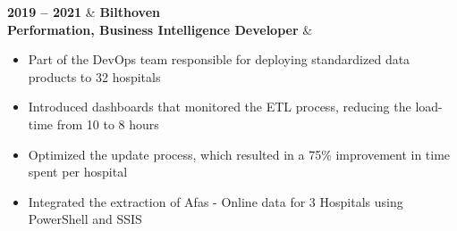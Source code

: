 \textbf{2019 – 2021} & \textbf{Bilthoven} \\
\textbf{Performation, Business Intelligence Developer} \faExternalLink & 
\begin{itemize}[leftmargin=0.5cm,itemsep=0pt,parsep=0pt]
\item Part of the DevOps team responsible for deploying standardized data products to 32 hospitals
\item Introduced dashboards that monitored the ETL process, reducing the load-time from 10 to 8 hours
\item Optimized the update process, which resulted in a 75\% improvement in time spent per hospital
\item Integrated the extraction of Afas - Online data for 3 Hospitals using PowerShell and SSIS
\end{itemize} \\ 